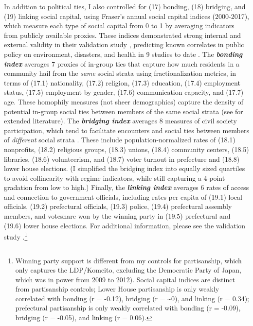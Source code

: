 \documentclass[preprint, 3p,
authoryear]{elsarticle} %
\begin{document}
In addition to political ties, I also controlled for (17) bonding, (18)
bridging, and (19) linking social capital, using Fraser's annual social
capital indices (2000-2017), which measure each type of social capital
from 0 to 1 by averaging indicators from publicly available proxies.
These indices demonstrated strong internal and external validity in
their validation study \citep{fraser_2021_IJDRR}, predicting known
correlates in public policy on environment, disasters, and health in 9
studies to date
\citep[eg.][]{fraser_et_al_2020, fraser_and_aldrich_2021_SR, fraser_et_al_2021_CRM, fraser_et_al_2022_EIST}.
The \textbf{\emph{bonding index}} averages 7 proxies of in-group ties
that capture how much residents in a community hail from the \emph{same}
social strata using fractionalization metrics, in terms of (17.1)
nationality, (17.2) religion, (17.3) education, (17.4) employment
status, (17.5) employment by gender, (17.6) communication capacity, and
(17.7) age. These homophily measures (not sheer demographics) capture
the density of potential in-group social ties between members of the
same social strata (see \citet{fraser_2021_IJDRR} for extended
literature). The \textbf{\emph{bridging index}} averages 8 measures of
civil society participation, which tend to facilitate encounters and
social ties between members of \emph{different} social strata
\citep{putnam_2000}. These include population-normalized rates of (18.1)
nonprofits, (18.2) religious groups, (18.3) unions, (18.4) community
centers, (18.5) libraries, (18.6) volunteerism, and (18.7) voter turnout
in prefecture and (18.8) lower house elections. (I simplified the
bridging index into equally sized quartiles to avoid collinearity with
regime indicators, while still capturing a 4-point gradation from low to
high.) Finally, the \textbf{\emph{linking index}} averages 6 rates of
access and connection to government officials, including rates per
capita of (19.1) local officials, (19.2) prefectural officials, (19.3)
police, (19.4) prefectural assembly members, and voteshare won by the
winning party in (19.5) prefectural and (19.6) lower house elections.
For additional information, please see the validation study
\citep{fraser_2021_IJDRR}.\footnote{Winning party support is different
  from my controls for partisanship, which only captures the
  LDP/Komeito, excluding the Democratic Party of Japan, which was in
  power from 2009 to 2012). Social capital indices are distinct from
  partisanship controls; Lower House partisanship is only weakly
  correlated with bonding (r = -0.12), bridging (r = \textasciitilde0),
  and linking (r = 0.34); prefectural partisanship is only weakly
  correlated with bonding (r = -0.09), bridging (r = -0.05), and linking
  (r = 0.06).}
\end{document}
